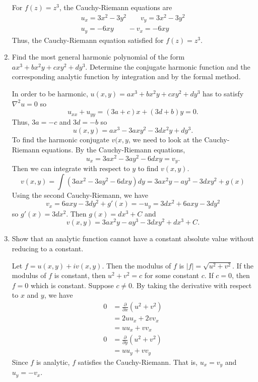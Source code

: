 \begin{enumerate}
  For \(f(z) = z^3\), the Cauchy-Riemann equations are
  \begin{gather*}
    u_x = 3x^2 - 3y^2 \qquad v_y = 3x^2 - 3y^2\\
    u_y = -6xy \qquad -v_x = -6xy
  \end{gather*}
  Thus, the Cauchy-Riemann equation satisfied for \(f(z) = z^3\).
\item
  Find the most general harmonic polynomial of the form
  \(ax^3 + bx^2y + cxy^2 + dy^3\).
  Determine the conjugate harmonic function and the corresponding analytic
  function by integration and by the formal method.
  \par\smallskip
  In order to be harmonic, \(u(x,y) = ax^3 + bx^2y + cxy^2 + dy^3\) has to
  satisfy \(\nabla^2u = 0\) so
  \[
  u_{xx} + u_{yy} = (3a + c)x + (3d + b)y = 0.
  \]
  Thus, \(3a = -c\) and \(3d = -b\) so
  \[
  u(x,y) = ax^3 - 3axy^2 - 3dx^2y + dy^3.
  \]
  To find the harmonic conjugate \(v(x,y\), we need to look at the
  Cauchy-Riemann equations.
  By the Cauchy-Riemann equations,
  \[
  u_x = 3ax^2 - 3ay^2 - 6dxy = v_y.
  \]
  Then we can integrate with respect to \(y\) to find \(v(x,y)\).
  \[
  v(x,y) = \int(3ax^2 - 3ay^2 - 6dxy)dy = 3ax^2y - ay^3 - 3dxy^2 + g(x)
  \]
  Using the second Cauchy-Riemann, we have
  \[
  v_x = 6axy - 3dy^2 + g'(x) = -u_y = 3dx^2 + 6axy - 3dy^2
  \]
  so \(g'(x) = 3dx^2\).
  Then \(g(x) = dx^3 + C\) and
  \[
  v(x,y) = 3ax^2y - ay^3 - 3dxy^2 + dx^3 + C.
  \]
\item
  Show that an analytic function cannot have a constant absolute value without
  reducing to a constant.
  \par\smallskip
  Let \(f = u(x,y) + iv(x,y)\).
  Then the modulus of \(f\) is \(\lvert f\rvert = \sqrt{u^2 + v^2}\).
  If the modulus of \(f\) is constant, then \(u^2 + v^2 = c\) for some constant
  \(c\).
  If \(c = 0\), then \(f = 0\) which is constant.
  Suppose \(c\neq 0\).
  By taking the derivative with respect to \(x\) and \(y\), we have
  \begin{align*}
    0 & = \frac{\partial}{\partial x}(u^2 + v^2)\\
      & = 2uu_x + 2vv_x\\
      & = uu_x + vv_x\\
    0 & = \frac{\partial}{\partial y}(u^2 + v^2)\\
      & = uu_y + vv_y
  \end{align*}
  Since \(f\) is analytic, \(f\) satisfies the Cauchy-Riemann.
  That is, \(u_x = v_y\) and \(u_y = -v_x\).
  \begin{subequations}

\end{subequations}
\end{enumerate}

